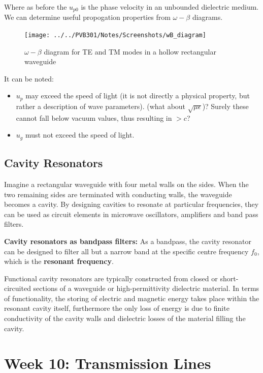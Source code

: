 \documentclass{book}
\begin{document}
Where as before the $u_{p0}$ is the phase velocity in an unbounded dielectric medium. We can determine useful propogation properties from $\omega - \beta$ diagrams.

\begin{figure}[h]
	\centering
	\texttt{[image: ../../PVB301/Notes/Screenshots/wB\_diagram]}
	\caption{$\omega-\beta$ diagram for TE and TM modes in a hollow rectangular waveguide}
	\label{fig:wbdiagram}
\end{figure}

It can be noted: 

\begin{itemize}
	\item \textbf{$u_p$} may exceed the speed of light (it is not directly a physical property, but rather a description of wave parameters). (what about $\sqrt{\mu \epsilon}$)? Surely these cannot fall below vacuum values, thus resulting in $>c$?
	\item \textbf{$u_g$} must not exceed the speed of light.
\end{itemize}


\subsection{Cavity Resonators}

Imagine a rectangular waveguide with four metal walls on the sides. When the two remaining sides are terminated with conducting walls, the waveguide becomes a cavity. By designing cavities to resonate at particular frequencies, they can be used as circuit elements in microwave oscillators, amplifiers and band pass filters.

\textbf{Cavity resonators as bandpass filters:} As a bandpass, the cavity resonator can be designed to filter all but a narrow band at the specific centre frequency $f_0$, which is the \textbf{resonant frequency}.

Functional cavity resonators are typically constructed from closed or short-circuited sections of a waveguide or high-permittivity dielectric material. In terms of functionality, the storing of electric and magnetic energy takes place within the resonant cavity itself, furthermore the only loss of energy is due to finite conductivity of the cavity walls and dielectric losses of the material filling the cavity.


\section{Week 10: Transmission Lines}
\end{document}
